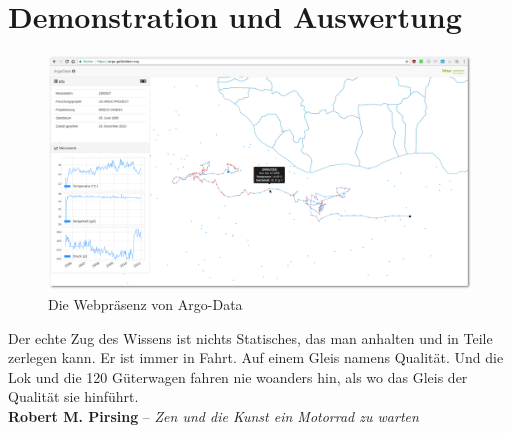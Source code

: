 \section{Demonstration und Auswertung}


\begin{figure}[H]
 \centering
 \includegraphics[width=\textwidth]{pix/argodata_complete.png}
 \caption{Die Webpräsenz von Argo-Data}
 \label{fig:argodataWeb}
\end{figure}






Der echte Zug des Wissens ist nichts Statisches, das man anhalten und in Teile zerlegen kann. Er ist immer in Fahrt. Auf einem Gleis namens Qualität. Und die Lok und die 120 Güterwagen fahren nie woanders hin, als wo das Gleis der Qualität sie hinführt.
\\
\hrulefill \vspace{0.3cm}
\textbf{Robert M. Pirsing} -- \textit{Zen und die Kunst ein Motorrad zu warten}

